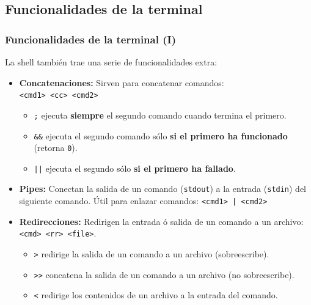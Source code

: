 \documentclass[aspectratio=43]{beamer}
\begin{document}
\subsection{Funcionalidades de la terminal}

\begin{frame}
    \frametitle{Funcionalidades de la terminal (I)}
    La shell también trae una serie de funcionalidades extra:

    \begin{itemize}
        \item \textbf{Concatenaciones:} Sirven para concatenar comandos:\\
        \texttt{<cmd1> <cc> <cmd2>}\\
        \begin{itemize}
            \item \texttt{;} ejecuta \textbf{siempre} el segundo comando cuando termina el primero.
            \item \texttt{\&\&} ejecuta el segundo comando sólo \textbf{si el primero ha funcionado} (retorna \texttt{0}).
            \item \texttt{||} ejecuta el segundo sólo \textbf{si el primero ha fallado}.
        \end{itemize}
        \item \textbf{Pipes:} Conectan la salida de un comando (\texttt{stdout}) a la entrada (\texttt{stdin}) del siguiente comando. Útil para enlazar comandos: \texttt{<cmd1> | <cmd2>}\\
        \item \textbf{Redirecciones:} Redirigen la entrada ó salida de un comando a un archivo: \texttt{<cmd> <rr> <file>}.
        \begin{itemize}
            \item \texttt{>} redirige la salida de un comando a un archivo (sobreescribe).
            \item \texttt{>>} concatena la salida de un comando a un archivo (no sobreescribe).
            \item \texttt{<} redirige los contenidos de un archivo a la entrada del comando.
        \end{itemize} 

    \end{itemize}

\end{frame}
\end{document}
